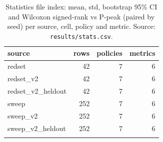 \begin{table}[htbp]
\centering
\footnotesize
\caption{Statistics file index: mean, std, bootstrap 95\% CI and Wilcoxon signed-rank vs P-peak (paired by seed) per source, cell, policy and metric. Source: \texttt{results/stats.csv}.}
\label{tab:stats}
\setlength{\tabcolsep}{3pt}
\begin{tabular}{lrrr}
\toprule
\textbf{source} & \textbf{rows} & \textbf{policies} & \textbf{metrics} \\
\midrule
redset & 42 & 7 & 6 \\
redset\_v2 & 42 & 7 & 6 \\
redset\_v2\_heldout & 42 & 7 & 6 \\
sweep & 252 & 7 & 6 \\
sweep\_v2 & 252 & 7 & 6 \\
sweep\_v2\_heldout & 252 & 7 & 6 \\
\botrule
\end{tabular}
\end{table}
